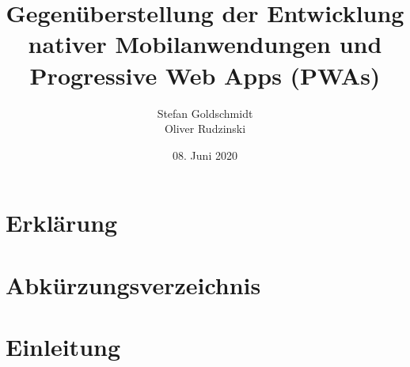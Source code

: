 


\title{Gegenüberstellung der Entwicklung\\nativer Mobilanwendungen und\\Progressive Web Apps (PWAs)} 
\author{Stefan Goldschmidt\\Oliver Rudzinski}
\date{08. Juni 2020}



\makeatletter
{}


	\clearpage
	
	\thispagestyle{empty}
	
	
	\clearpage
	\chapter*{Erklärung}
		
	\thispagestyle{empty}
	
	\clearpage
	
	\thispagestyle{empty}
	
	{\small\tableofcontents}
	\thispagestyle{empty}
	
	\chapter*{Abkürzungsverzeichnis}
		
	
	\listoffigures

	\listoftables

	\listoflistings


	\chapter{Einleitung}
		\label{chap:einleitung}
		
	
